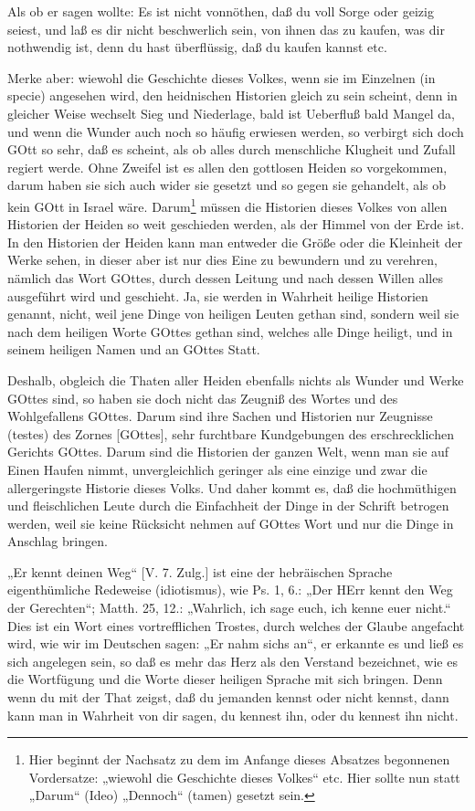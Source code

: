 Als ob er sagen wollte: Es ist nicht vonnöthen, daß du voll Sorge oder geizig seiest, und laß es dir nicht beschwerlich sein, von ihnen das zu kaufen, was dir nothwendig ist, denn du hast überflüssig, daß du kaufen kannst etc.

Merke aber: wiewohl die Geschichte dieses Volkes, wenn sie im Einzelnen (in specie) angesehen wird, den heidnischen Historien gleich zu sein scheint, denn in gleicher Weise wechselt Sieg und Niederlage, bald ist Ueberfluß bald Mangel da, und wenn die Wunder auch noch so häufig erwiesen werden, so verbirgt sich doch GOtt so sehr, daß es scheint, als ob alles durch menschliche Klugheit und Zufall regiert werde. Ohne Zweifel ist es allen den gottlosen Heiden so vorgekommen, darum haben sie sich auch wider sie gesetzt und so gegen sie gehandelt, als ob kein
GOtt in Israel wäre. Darum\footnote{Hier beginnt der Nachsatz zu dem im Anfange dieses Absatzes begonnenen Vordersatze: „wiewohl die Geschichte dieses Volkes“ etc. Hier sollte nun statt „Darum“ (Ideo) „Dennoch“ (tamen) gesetzt sein.} müssen die Historien dieses Volkes von allen Historien der Heiden so weit geschieden werden, als der Himmel von der Erde ist. In den Historien der Heiden kann man entweder die Größe oder die Kleinheit der Werke sehen, in dieser aber ist nur dies Eine zu bewundern und zu verehren, nämlich das Wort GOttes, durch dessen Leitung und nach dessen Willen alles ausgeführt wird und geschieht. Ja, sie werden in Wahrheit heilige Historien genannt, nicht, weil jene Dinge von heiligen Leuten gethan sind, sondern weil sie nach dem heiligen Worte GOttes gethan sind, welches alle Dinge heiligt, und in seinem heiligen Namen und an GOttes Statt.

Deshalb, obgleich die Thaten aller Heiden ebenfalls nichts als Wunder und Werke GOttes sind, so haben sie doch nicht das Zeugniß des Wortes und des Wohlgefallens GOttes. Darum sind ihre Sachen und Historien nur Zeugnisse (testes) des Zornes [GOttes], sehr furchtbare Kundgebungen des erschrecklichen Gerichts GOttes. Darum sind die Historien der ganzen Welt, wenn man sie auf Einen Haufen nimmt, unvergleichlich geringer als eine einzige und zwar die allergeringste Historie dieses Volks. Und daher kommt es, daß die hochmüthigen und fleischlichen Leute durch die Einfachheit der Dinge in der Schrift betrogen werden, weil sie keine Rücksicht nehmen auf GOttes Wort und nur die Dinge in Anschlag bringen.

„Er kennt deinen Weg“ [V. 7. Zulg.] ist eine der hebräischen Sprache eigenthümliche Redeweise (idiotismus), wie Ps. 1, 6.: „Der HErr kennt den Weg der Gerechten“; Matth. 25, 12.: „Wahrlich, ich sage euch, ich kenne euer nicht.“ Dies ist ein Wort eines vortrefflichen Trostes, durch welches der Glaube angefacht wird, wie wir im Deutschen sagen: „Er nahm sichs an“, er erkannte es und ließ es sich angelegen sein, so daß es mehr das Herz als den Verstand bezeichnet, wie es die Wortfügung und die Worte dieser heiligen Sprache mit sich bringen. Denn wenn du mit der That zeigst, daß du jemanden kennst oder nicht kennst, dann kann man in Wahrheit von dir sagen, du kennest ihn, oder du kennest ihn nicht.

